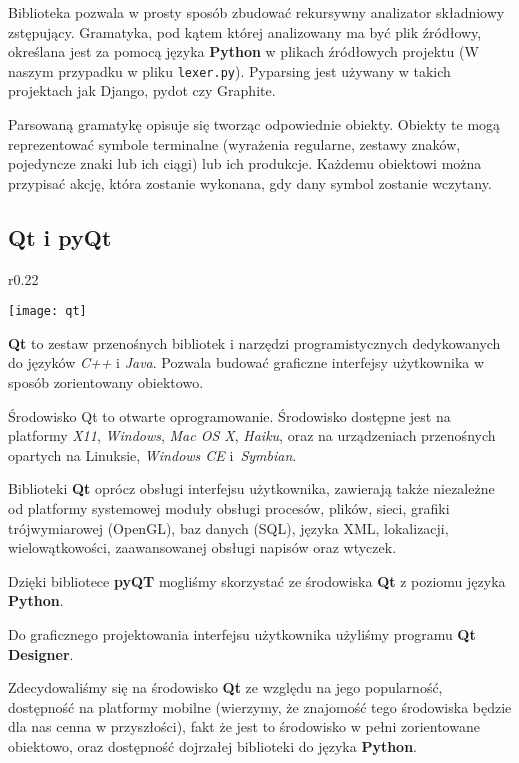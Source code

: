 Biblioteka pozwala w prosty sposób zbudować rekursywny analizator składniowy zstępujący.
Gramatyka, pod kątem której analizowany ma być plik źródłowy, określana jest za pomocą języka \textbf{Python} w plikach źródłowych projektu (W naszym przypadku w pliku \texttt{lexer.py}).
Pyparsing jest używany w takich projektach jak Django, pydot czy Graphite.

Parsowaną gramatykę opisuje się tworząc odpowiednie obiekty.
Obiekty te mogą reprezentować symbole terminalne (wyrażenia regularne, zestawy znaków, pojedyncze znaki lub ich ciągi) lub ich produkcje.
Każdemu obiektowi można przypisać akcję, która zostanie wykonana, gdy dany symbol zostanie wczytany.

\subsection{Qt i pyQt}
\begin{wrapfigure}{r}{0.22\textwidth}
  \begin{center}
    \texttt{[image: qt]}
  \end{center}
\end{wrapfigure}
\textbf{Qt} to zestaw przenośnych bibliotek i narzędzi programistycznych dedykowanych do języków \emph{C++} i \emph{Java}.
Pozwala budować graficzne interfejsy użytkownika w sposób zorientowany obiektowo.

Środowisko Qt to otwarte oprogramowanie.
Środowisko dostępne jest na platformy \emph{X11}, \emph{Windows}, \emph{Mac OS X}, \emph{Haiku}, oraz na urządzeniach przenośnych opartych na Linuksie, \emph{Windows CE} i~\emph{Symbian}.

Biblioteki \textbf{Qt} oprócz obsługi interfejsu użytkownika, zawierają także niezależne od platformy systemowej moduły obsługi procesów, plików, sieci, grafiki trójwymiarowej (OpenGL), baz danych (SQL), języka XML, lokalizacji, wielowątkowości, zaawansowanej obsługi napisów oraz wtyczek.

Dzięki bibliotece \textbf{pyQT} mogliśmy skorzystać ze środowiska \textbf{Qt} z poziomu języka \textbf{Python}.

Do graficznego projektowania interfejsu użytkownika użyliśmy programu \textbf{Qt Designer}.

Zdecydowaliśmy się na środowisko \textbf{Qt} ze względu na jego popularność, dostępność na platformy mobilne (wierzymy, że znajomość tego środowiska będzie dla nas cenna w przyszłości), fakt że jest to środowisko w pełni zorientowane obiektowo, oraz dostępność dojrzałej biblioteki do języka \textbf{Python}.

